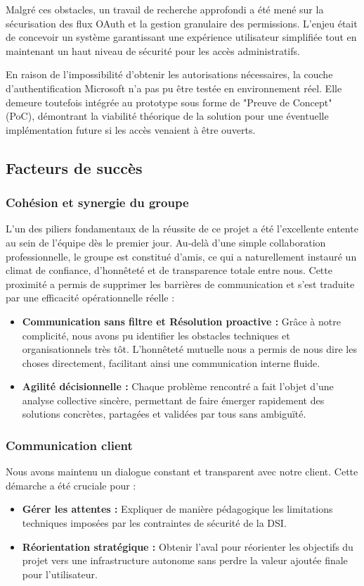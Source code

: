\documentclass[a4paper,12pt]{article}
\begin{document}
Malgré ces obstacles, un travail de recherche approfondi a été mené sur la sécurisation des flux OAuth et la gestion granulaire des permissions. L'enjeu était de concevoir un système garantissant une expérience utilisateur simplifiée tout en maintenant un haut niveau de sécurité pour les accès administratifs.

En raison de l'impossibilité d'obtenir les autorisations nécessaires, la couche d'authentification Microsoft n'a pas pu être testée en environnement réel. Elle demeure toutefois intégrée au prototype sous forme de "Preuve de Concept" (PoC), démontrant la viabilité théorique de la solution pour une éventuelle implémentation future si les accès venaient à être ouverts.

\subsection{Facteurs de succès}

\subsubsection{Cohésion et synergie du groupe}
L'un des piliers fondamentaux de la réussite de ce projet a été l'excellente entente au sein de l'équipe dès le premier jour. Au-delà d'une simple collaboration professionnelle, le groupe est constitué d'amis, ce qui a naturellement instauré un climat de confiance, d'honnêteté et de transparence totale entre nous. Cette proximité a permis de supprimer les barrières de communication et s'est traduite par une efficacité opérationnelle réelle :
\begin{itemize}[label=\textbullet, itemsep=5pt]
    \item \textbf{Communication sans filtre et Résolution proactive :} Grâce à notre complicité, nous avons pu identifier les obstacles techniques et organisationnels très tôt. L'honnêteté mutuelle nous a permis de nous dire les choses directement, facilitant ainsi une communication interne fluide.
    \item \textbf{Agilité décisionnelle :} Chaque problème rencontré a fait l'objet d'une analyse collective sincère, permettant de faire émerger rapidement des solutions concrètes, partagées et validées par tous sans ambiguïté.
\end{itemize}

\subsubsection{Communication client}
Nous avons maintenu un dialogue constant et transparent avec notre client. Cette démarche a été cruciale pour :
\begin{itemize}[label=\textbullet, itemsep=5pt]
    \item \textbf{Gérer les attentes :} Expliquer de manière pédagogique les limitations techniques imposées par les contraintes de sécurité de la DSI.
    \item \textbf{Réorientation stratégique :} Obtenir l'aval pour réorienter les objectifs du projet vers une infrastructure autonome sans perdre la valeur ajoutée finale pour l'utilisateur.
\end{itemize}
\end{document}
